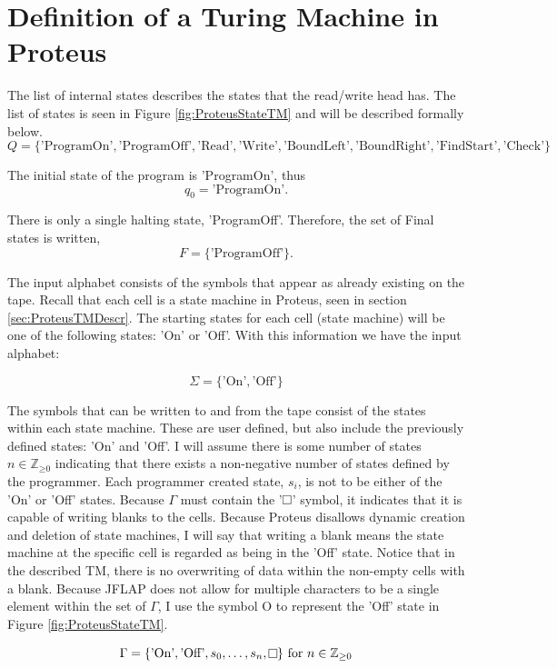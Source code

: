 \section{Definition of a Turing Machine in Proteus}\label{sec:DefnTMProteus}

The list of internal states describes the states that the read/write head has.
The list of states is seen in Figure \ref{fig:ProteusStateTM} and will be described formally below.
\[
Q = \{\text{'ProgramOn'}, \text{'ProgramOff'}, \text{'Read'}, \text{'Write'}, \text{'BoundLeft'}, \text{'BoundRight'}, \text{'FindStart'}, \text{'Check'}\}
\]

The initial state of the program is 'ProgramOn', thus \[q_{0} = \text{'ProgramOn'}.\]

There is only a single halting state, 'ProgramOff'.
Therefore, the set of Final states is written, \[F = \{\text{'ProgramOff'}\}.\]

The input alphabet consists of the symbols that appear as already existing on the tape.
Recall that each cell is a state machine in Proteus, seen in section \ref{sec:ProteusTMDescr}.
The starting states for each cell (state machine) will be one of the following states: 'On' or 'Off'.
With this information we have the input alphabet:

\[
\Sigma = \{\text{'On'}, \text{'Off'}\}
\]

The symbols that can be written to and from the tape consist of the states within each state machine.
These are user defined, but also include the previously defined states: 'On' and 'Off'.
I will assume there is some number of states $n \in \mathbb{Z}_{\geq \text{0}}$ indicating that there exists a non-negative number of states defined by the programmer.
Each programmer created state, $s_i$, is not to be either of the 'On' or 'Off' states.
Because $\Gamma$ must contain the '$\raisebox{0.1cm}{\fbox{}}$' symbol, it indicates that it is capable of writing blanks to the cells.
Because Proteus disallows dynamic creation and deletion of state machines, I will say that writing a blank means the state machine at the specific cell is regarded as being in the 'Off' state.
Notice that in the described TM, there is no overwriting of data within the non-empty cells with a blank.
Because JFLAP does not allow for multiple characters to be a single element within the set of $\Gamma$, I use the symbol O to represent the 'Off' state in Figure \ref{fig:ProteusStateTM}.

\[
\Gamma = \{\text{'On'}, \text{'Off'}, s_{0}, \dots, s_{n}, \raisebox{0.1cm}{\fbox{}}\} \text{ for } n \in \mathbb{Z}_{\geq \text{0}}
\]

